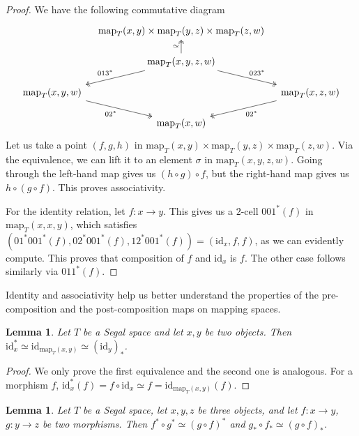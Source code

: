 \documentclass[11pt, a4paper]{amsart}
\newcommand{\map}{\mathrm{map}}
\newcommand{\id}{\mathrm{id}}
\newtheorem{lemma}[equation]{Lemma}
\theoremstyle{definition}
\theoremstyle{remark}
\numberwithin{equation}{section}
\begin{document}
 \begin{proof}
  We have the following commutative diagram
  \[
   \begin{tikzcd}[row sep =0.5cm, column sep=0.3cm]
    & \map_T(x,y) \times \map_T(y,z) \times \map_T(z,w) & \\
    & \map_T(x,y,z,w) \arrow[dl, "013^*"', twoheadrightarrow] \arrow[dr, "023^*", twoheadrightarrow]  \arrow[u, twoheadrightarrow, "\simeq"] & \\
    \map_T(x,y,w) \arrow[dr, "02^*"', twoheadrightarrow] & & \map_T(x,z,w) \arrow[dl, "02^*", twoheadrightarrow] \\
    & \map_T(x,w) &
   \end{tikzcd}
  \]
  Let us take a point $(f,g,h)$ in $\map_T(x,y) \times \map_T(y,z) \times \map_T(z,w)$. Via the equivalence, we can lift it to an element $\sigma$ in $\map_T(x,y,z,w)$. Going through the left-hand map gives us $(h \circ g) \circ f$, but the right-hand map gives us $h \circ (g \circ f)$. This proves associativity.
   
  For the identity relation, let $f\colon x \to y$. This gives us a $2$-cell $001^*(f)$ in $\map_T(x,x,y)$, which satisfies $(01^*001^*(f),02^*001^*(f),12^*001^*(f)) = (\id_x,f,f)$, as we can evidently compute. This proves that composition of $f$ and $\id_x$ is $f$. The other case follows similarly via $011^*(f)$.
 \end{proof}

Identity and associativity help us better understand the properties of the pre-composition and the post-composition maps on mapping spaces.

\begin{lemma}\label{lemma:pre post composition id}
  Let $T$ be a Segal space and let $x,y$ be two objects. Then $\id_x^* \simeq \id_{\map_T(x,y)}\simeq (\id_y)_*$.
\end{lemma}

\begin{proof}
 We only prove the first equivalence and the second one is analogous. For a morphism $f$, $\id_x^*(f) = f \circ \id_x \simeq f = \id_{\map_T(x,y)}(f)$.
\end{proof}

\begin{lemma} \label{lemma:pre post composition compose}
  Let $T$ be a Segal space, let $x,y,z$ be three objects, and let $f\colon x \to y$, $g\colon y \to z$ be two morphisms. Then $f^* \circ g^* \simeq (g \circ f)^*$ and $g_* \circ f_* \simeq (g \circ f)_*$.
\end{lemma}
\end{document}
